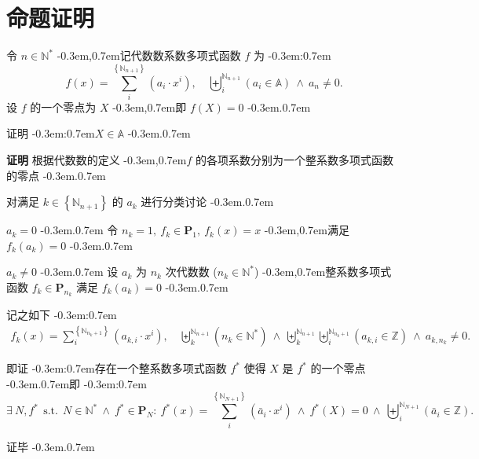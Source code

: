 \documentclass{article}
\newcommand\BrSetN[1]{\Set{\MathPartialSetN{#1}}}
\newcommand\InPartialSetN[2]{\InSet{#1}{\BrSetN{#2}}}
\newcommand\InSetA[1]{\InSet{#1}{\MathSetA}}
\newcommand\InSetU[1]{\InSet{#1}{\MathSetU}}
\newcommand\InSetZ[1]{\InSet{#1}{\MathSetZ}}
\newcommand\MathPartialSetN[1]{\mathbb{N}_{#1}}
\newcommand\MathSetA{\mathbb{A}}
\newcommand\MathSetU{\mathbb{N}^{*}}
\newcommand\MathSetZ{\mathbb{Z}}
\newcommand\SeqOfNInSetA[3]{\SeqOfN{#1}{#2}{\Bracket{\InSetA{#3_{#1}}}}}
\newcommand\SeqOfNInSetU[3]{\SeqOfN{#1}{#2}{\Bracket{\InSetU{#3_{#1}}}}}
\newcommand\SeqOfNNInSetZ[5]{\SeqOfN{#1}{#2}{\SeqOfN{#3}{#4}{\Bracket{\InSetZ{#5_{\MultiSub{#1}{#3}}}}}}}
\newcommand\SeqOfN[3]{\Seq{#1}{\MathPartialSetN{#2}}{#3}}
\newcommand\SumOfN[3]{\Sum{#1}{\BrSetN{#2}}{#3}}
\newcommand\Appose{\Comma}
\newcommand\Bracket[1]{\left( #1 \right)}
\newcommand\BracketBig[1]{\left\{ #1 \right\}}
\newcommand\Colon{:}
\newcommand\Comma{,}
\newcommand\CommaAnd{\Space{\Comma}}
\newcommand\CommaSub{\Comma}
\newcommand\Domain[1]{\DomainComma \quad #1}
\newcommand\DomainAnd{\LogicAnd}
\newcommand\DomainComma{\Comma}
\newcommand\Enumerate[1]{#1^{\circ}}
\newcommand\Exists[3]{\Satisfy{\exists}{#1}{#2}{#3}}
\newcommand\Func[2]{#1 \Bracket{#2}}
\newcommand\InSet[2]{#1 \in #2}
\newcommand\InPolynomialSet[2]{\InSet{#1}{\PolynomialSet{#2}}}
\newcommand\Logic[1]{\ #1\ }
\newcommand\LogicAnd{\Logic{\wedge}}
\newcommand\MultiSub[2]{#1 \CommaSub #2}
\newcommand\NeqZero[1]{#1 \neq 0}
\newcommand\Polynomial[2]{\SumOfN{i}{#1}{\Bracket{#2_{i} \cdot x^{i}}}}
\newcommand\PolynomialA{\Polynomial{n+1}{a}}
\newcommand\PolynomialSet[1]{\mathbf{P}_{#1}}
\newcommand\PolynomialSub[3]{\SumOfN{i}{#3_{#1}+1}{\Bracket{#2_{\MultiSub{#1}{i}} \cdot x^{i}}}}
\newcommand\PolynomialSubA[1]{\PolynomialSub{#1}{a}{n}}
\newcommand\Satisfy[4]{\Space{#1} #2 \SuchThat #3 \Space{\Colon} #4}
\newcommand\Seq[3]{\biguplus_{#1}^{#2} #3}
\newcommand\Set[1]{\BracketBig{#1}}
\newcommand\Space[1]{#1\ }
\newcommand\SuchThat{\Logic{\Logic{\text{s.t.}}}}
\newcommand\Sum[3]{\sum_{#1}^{#2} #3}
\newcommand\BmEnumerate[1]{\bm{$\Enumerate{#1}$} \quad}
\newcommand\Category[2]{\BmEnumerate{#1} #2 \TextPeriod}
\newcommand\EqEndPeriod{.}
\newcommand\SubTitle[1]{\textbf{#1} \quad}
\newcommand\TextBracket[1]{(#1)}
\newcommand\TextColon{\TextPunctuation{\Colon}}
\newcommand\TextComma{\TextPunctuation{\Comma}}
\newcommand\TextPeriod{\TextPunctuation{.}}
\newcommand\TextPunctuation[1]{\kern -0.3em#1\kern 0.7em}
\newenvironment{proof}{\SubTitle{证明}}{\par 证毕 \TextPeriod}
\begin{document}
	
	\section{命题证明} \label{sec:4}
	令 $\InSetU{n}$ \TextComma 记代数数系数多项式函数 $f$ 为 \TextColon
	\begin{equation*}
	\Func{f}{x} = \PolynomialA \Domain{\SeqOfNInSetA{i}{n+1}{a} \DomainAnd \NeqZero{a_{n}}} \EqEndPeriod
	\end{equation*}
	设 $f$ 的一个零点为 $X$ \TextComma 即 $\Func{f}{X} = 0$ \TextPeriod
	
	证明 \TextColon $\InSetA{X}$ \TextPeriod
	
	\begin{proof}
		根据代数数的定义 \TextComma $f$ 的各项系数分别为一个整系数多项式函数的零点 \TextPeriod
		
		对满足 $\InPartialSetN{k}{n+1}$ 的 $a_{k}$ 进行分类讨论 \TextPeriod
		
		\Category{1}{$a_{k} = 0$} 令 $n_{k} = 1 \CommaAnd \InPolynomialSet{f_{k}}{1} \CommaAnd \Func{f_{k}}{x} = x$ \TextComma 满足 $\Func{f_{k}}{a_{k}} = 0$ \TextPeriod
		
		\Category{2}{$\NeqZero{a_{k}}$} 设 $a_{k}$ 为 $n_{k}$ 次代数数 \TextBracket{$\InSetU{n_{k}}$} \TextComma 整系数多项式函数 $\InPolynomialSet{f_{k}}{n_{k}}$ 满足 $\Func{f_{k}}{a_{k}} = 0$ \TextPeriod
		
		记之如下 \TextColon
		\begin{align*}
		\Func{f_{k}}{x} = \PolynomialSubA{k} \Domain{\SeqOfNInSetU{k}{n+1}{n} \DomainAnd \SeqOfNNInSetZ{k}{n+1}{i}{n_{k}+1}{a} \DomainAnd \NeqZero{a_{\MultiSub{k}{n_{k}}}}} \EqEndPeriod
		\end{align*}
		
		即证 \TextColon 存在一个整系数多项式函数 $f^{*}$ 使得 $X$ 是 $f^{*}$ 的一个零点 \TextPeriod 即 \TextColon
		\begin{equation*}
		\Exists{N \Appose f^{*}}{\InSetU{N} \LogicAnd \InPolynomialSet{f^{*}}{N}}{\Func{f^{*}}{x} = \Polynomial{N+1}{\bar{a}} \LogicAnd \Func{f^{*}}{X} = 0 \LogicAnd \SeqOfN{i}{N+1}{\Bracket{\InSetZ{\bar{a}_{i}}}}} \EqEndPeriod
		\end{equation*}
		

\end{proof}
\end{document}

